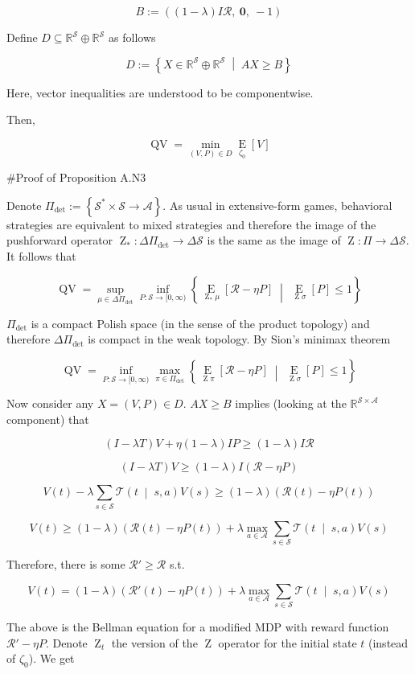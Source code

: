\documentclass[a4paper]{article}
\newcommand{\AP}[1]{\left(#1\right)}
\newcommand{\AB}[1]{\left[#1\right]}
\newcommand{\AC}[1]{\left\{#1\right\}}
\newcommand{\APM}[2]{\left(#1\;\middle\vert\;#2\right)}
\newcommand{\ACM}[2]{\left\{#1\;\middle\vert\;#2\right\}}
\newcommand{\Ea}[2]{\underset{#1}{\operatorname{E}}\AB{#2}}
\newcommand{\Reals}{\mathbb{R}}
\newcommand{\A}{\mathcal{A}}
\newcommand{\St}{\mathcal{S}}
\newcommand{\T}{\mathcal{T}}
\newcommand{\R}{\mathcal{R}}
\newcommand{\Pe}{P}
\newcommand{\QV}{\operatorname{QV}}
\DeclareMathOperator{\Z}{Z}
\begin{document}
$$B:=\AP{(1-\lambda)I\R,\ \boldsymbol{0},\ -1}$$

Define $D \subseteq \Reals^\St \oplus \Reals^\St$ as follows

$$D:=\ACM{X \in \Reals^\St \oplus \Reals^\St}{AX \geq B}$$

Here, vector inequalities are understood to be componentwise.

Then,

$$\QV = \min_{(V,P)\in D}{\Ea{\zeta_0}{V}}$$

\#Proof of Proposition A.N3

Denote $\Pi_{\det}:=\AC{\St^* \times \St \rightarrow \A}$. As usual in extensive-form games, behavioral strategies are equivalent to mixed strategies and therefore the image of the pushforward operator $\Z_*: \Delta\Pi_{\det} \rightarrow \Delta\St$ is the same as the image of $\Z: \Pi \rightarrow \Delta\St$. It follows that

$$\QV = \sup_{\mu \in \Delta\Pi_{\det}}\inf_{\Pe:\St\rightarrow[0,\infty)}\ACM{\Ea{\Z_*\mu}{\R-\eta\Pe}}{\Ea{\Z\sigma}{\Pe}\leq1}$$

$\Pi_{\det}$ is a compact Polish space (in the sense of the product topology) and therefore $\Delta\Pi_{\det}$ is compact in the weak topology. By Sion's minimax theorem

$$\QV = \inf_{\Pe:\St\rightarrow[0,\infty)}\max_{\pi \in \Pi_{\det}}\ACM{\Ea{\Z\pi}{\R-\eta\Pe}}{\Ea{\Z\sigma}{\Pe}\leq1}$$

Now consider any $X=(V,P) \in D$. $AX \geq B$ implies (looking at the $\Reals^{\St\times\A}$ component) that

$$\AP{I-\lambda T}V + \eta(1-\lambda)IP \geq (1-\lambda)I\R$$

$$\AP{I-\lambda T}V\geq (1-\lambda)I(\R-\eta P)$$

$$V(t) - \lambda \sum_{s \in \St} \T\APM{t}{s,a} V(s) \geq (1-\lambda)\AP{\R(t)-\eta P(t)}$$

$$V(t) \geq (1-\lambda)\AP{\R(t)-\eta P(t)} + \lambda \max_{a \in \A } \sum_{s \in \St} \T\APM{t}{s,a} V(s)$$

Therefore, there is some $\R' \geq \R$ s.t.

$$V(t) = (1-\lambda)\AP{\R'(t)-\eta P(t)} + \lambda \max_{a \in \A } \sum_{s \in \St} \T\APM{t}{s,a} V(s)$$

The above is the Bellman equation for a modified MDP with reward function $\R'-\eta P$. Denote $\Z_t$ the version of the $\Z$ operator for the initial state $t$ (instead of $\zeta_0$). We get
\end{document}
